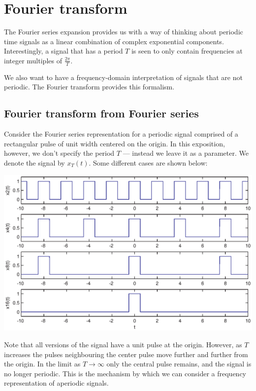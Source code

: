 \documentclass[10pt]{beamer}
\begin{document}
\pagestyle{fancy}
\fancyhead{}
\renewcommand{\headrulewidth}{0pt}
\fancyfoot[C]{\thesection-\thepage}

\begin{frame}
\titlepage
\end{frame}

\setcounter{section}{4}
\section{Fourier transform}

The Fourier series expansion provides us with a way of thinking about periodic time signals as a linear combination of complex exponential components.  Interestingly, a signal that has a period $T$ is seen to only contain frequencies at integer multiples of $\frac{2 \pi}{T}$.

We also want to have a frequency-domain interpretation of signals that are not periodic.  The Fourier transform provides this formalism.  

\subsection{Fourier transform from Fourier series}

Consider the Fourier series representation for a periodic signal comprised of a rectangular pulse of unit width centered on the origin.  In this exposition, however, we don't specify the period $T$ --- instead we leave it as a parameter.  We denote the signal by $x_T(t)$.  Some different cases are shown below:
\begin{center}
  \includegraphics{fs2ft1}
\end{center}
Note that all versions of the signal have a unit pulse at the origin.  However, as $T$ increases the pulses neighbouring the center pulse move further and further from the origin.  In the limit as $T \to \infty$ only the central pulse remains, and the signal is no longer periodic.  This is the mechanism by which we can consider a frequency representation of aperiodic signals. 
\end{document}
